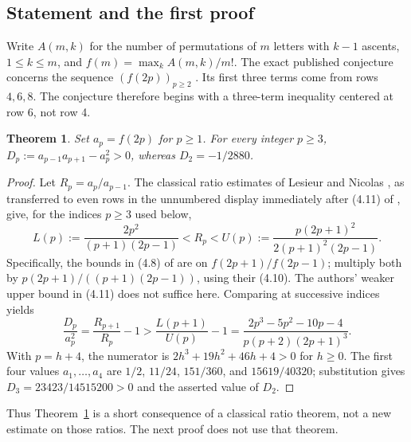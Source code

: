 \documentclass[11pt,a4paper]{article}
\newtheorem{SourceRcfKtheorem}{Theorem}
\begin{document}
\subsection{Statement and the first proof}
Write $A(m,k)$ for the number of permutations of $m$ letters with
$k-1$ ascents, $1\le k\le m$, and $f(m)=\max_k A(m,k)/m!$.
The exact published conjecture concerns the sequence
$(f(2p))_{p\ge2}$ \cite[end of Section~4]{R25K:AG}. Its first three
terms come from rows $4,6,8$. The conjecture therefore begins with
a three-term inequality centered at row 6, not row 4.
\begin{SourceRcfKtheorem}\label{R25K:t:main}
Set $a_p=f(2p)$ for $p\ge1$. For every integer $p\ge3$,
$D_p:=a_{p-1}a_{p+1}-a_p^2>0$, whereas $D_2=-1/2880$.
\end{SourceRcfKtheorem}
\begin{proof}
Let $R_p=a_p/a_{p-1}$. The classical ratio estimates of Lesieur and
Nicolas \cite[Theorem~2, p.~395]{R25K:LN}, as transferred to even rows
in the unnumbered display immediately after (4.11) of \cite{R25K:AG}, give,
for the indices $p\ge 3$ used below,
\[
 L(p):=\frac{2p^2}{(p+1)(2p-1)}
   <R_p<
 U(p):=\frac{p(2p+1)^2}{2(p+1)^2(2p-1)}.
\]
Specifically, the bounds in (4.8) of \cite{R25K:AG} are on
$f(2p+1)/f(2p-1)$; multiply both by
$p(2p+1)/((p+1)(2p-1))$, using their (4.10).
The authors' weaker upper bound in (4.11) does not suffice here.
Comparing at successive indices yields
\[
 \frac{D_p}{a_p^2}=\frac{R_{p+1}}{R_p}-1
 >\frac{L(p+1)}{U(p)}-1
 =\frac{2p^3-5p^2-10p-4}{p(p+2)(2p+1)^3}.
\]
With $p=h+4$, the numerator is $2h^3+19h^2+46h+4>0$ for
$h\ge0$. The first four values $a_1,\ldots,a_4$ are
$1/2$, $11/24$, $151/360$, and $15619/40320$; substitution gives
$D_3=23423/14515200>0$ and the asserted value of $D_2$.
\end{proof}
Thus Theorem~\ref{R25K:t:main} is a short consequence of a classical
ratio theorem, not a new estimate on those ratios. The next proof
does not use that theorem.
\end{document}
